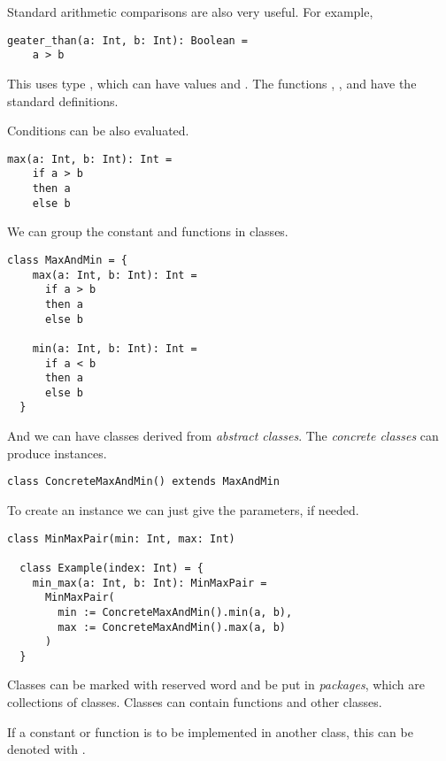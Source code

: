 Standard arithmetic comparisons are also very useful.
For example,
\begin{lstlisting}[label={lst:exampleComparison}]
  geater_than(a: Int, b: Int): Boolean =
    a > b
\end{lstlisting}

This uses type , which can have values \sodafalse and \sodatrue.
The functions \sodaand, \sodaor, and \sodanot have the standard definitions.

Conditions can be also evaluated.
\begin{lstlisting}[label={lst:exampleMax}]
  max(a: Int, b: Int): Int =
    if a > b
    then a
    else b
\end{lstlisting}

We can group the constant and functions in classes.

\begin{lstlisting}[label={lst:exampleClassMax}]
  class MaxAndMin = {
    max(a: Int, b: Int): Int =
      if a > b
      then a
      else b

    min(a: Int, b: Int): Int =
      if a < b
      then a
      else b
  }
\end{lstlisting}

And we can have classes derived from \emph{abstract classes}.
The \emph{concrete classes} can produce instances.

\begin{lstlisting}[label={lst:exampleClassMaxWithIndex}]
  class ConcreteMaxAndMin() extends MaxAndMin
\end{lstlisting}

To create an instance we can just give the parameters, if needed.

\begin{lstlisting}[label={lst:exampleClassMaxAnInstance}]
  class MinMaxPair(min: Int, max: Int)

  class Example(index: Int) = {
    min_max(a: Int, b: Int): MinMaxPair =
      MinMaxPair(
        min := ConcreteMaxAndMin().min(a, b),
        max := ConcreteMaxAndMin().max(a, b)
      )
  }
\end{lstlisting}

Classes can be marked with \sodapackage reserved word and be put in \emph{packages}, which are collections of classes.
Classes can contain functions and other classes.

If a constant or function is to be implemented in another class, this can be denoted with \sodaabstract.

